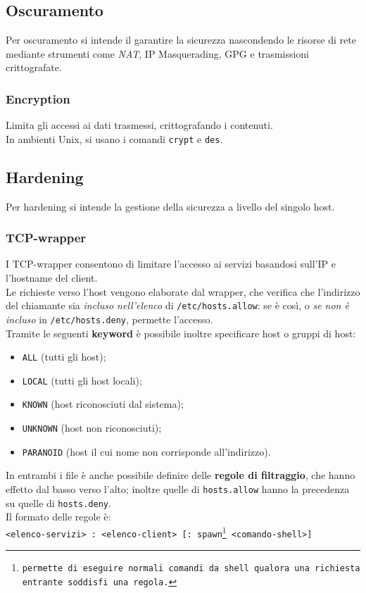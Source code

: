 \documentclass[a4paper,11pt]{article}
\def\code#1{\texttt{#1}}
\begin{document}
\subsection{Oscuramento}
Per oscuramento si intende il garantire la sicurezza nascondendo le risorse di rete mediante strumenti come \textit{NAT}, IP Masquerading, GPG e trasmissioni crittografate.
\subsubsection{Encryption} Limita gli accessi ai dati trasmessi, crittografando i contenuti.\\
In ambienti Unix, si usano i comandi \code{crypt} e \code{des}.
\subsection{Hardening} 
Per hardening si intende la gestione della sicurezza a livello del singolo host.
\subsubsection{TCP-wrapper} 
I TCP-wrapper consentono di limitare l'accesso ai servizi basandosi sull'IP e l'hostname del client. \\
Le richieste verso l'host vengono elaborate dal wrapper, che verifica che l'indirizzo del chiamante sia \textit{incluso nell'elenco }di \code{/etc/hosts.allow}: se è così, o \textit{se non è incluso }in \code{/etc/hosts.deny}, permette l'accesso.\\
Tramite le seguenti \textbf{keyword} è possibile inoltre specificare host o gruppi di host: 
\begin{itemize}
\item \code{ALL} (tutti gli host);
\item \code{LOCAL} (tutti gli host locali);
\item \code{KNOWN} (host riconosciuti dal sistema);
\item \code{UNKNOWN} (host non riconosciuti);
\item \code{PARANOID} (host il cui nome non corrisponde all'indirizzo).
\end{itemize}
In entrambi i file è anche possibile definire delle \textbf{regole di filtraggio}, che hanno effetto dal basso verso l'alto; inoltre quelle di \code{hosts.allow} hanno la precedenza su quelle di \code{hosts.deny}.\\
Il formato delle regole è:
\\ \code{<elenco-servizi> : <elenco-client> [: spawn\footnote{permette di eseguire normali comandi da shell qualora una richiesta entrante soddisfi una regola.} <comando-shell>]}\\
\end{document}
